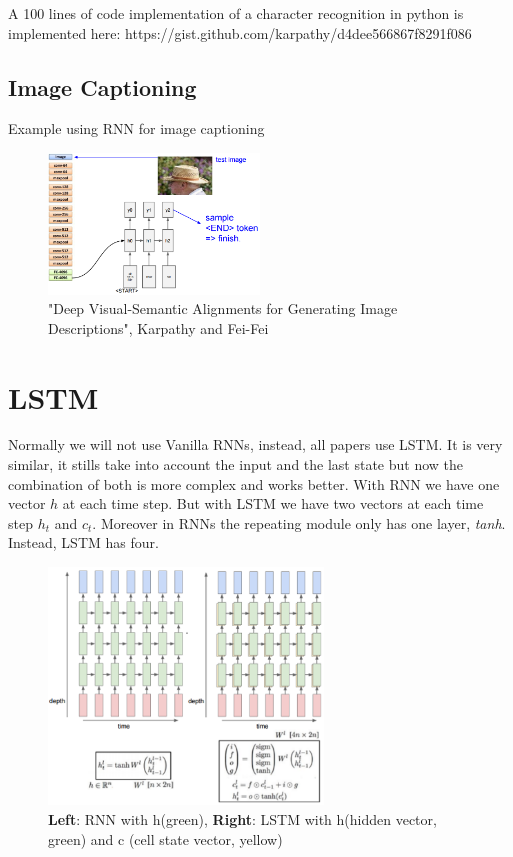 A 100 lines of code implementation of a character recognition in python is implemented here:
https://gist.github.com/karpathy/d4dee566867f8291f086

\subsection*{Image Captioning}
Example using RNN for image captioning
\begin{figure}[h]
  \centering
  \includegraphics[width=0.5\textwidth]{Images/recurrent_neural_networks/6.png}
  \caption{"Deep Visual-Semantic Alignments for Generating Image Descriptions", Karpathy and Fei-Fei}
\end{figure}

\section{LSTM}
Normally we will not use Vanilla RNNs, instead, all papers use LSTM. It is very similar, it stills take into account the input and the last state but now the combination of both is more complex and works better. With RNN we have one vector $h$ at each time step. But with LSTM we have two vectors at each time step $h_t$ and $c_t$. Moreover in RNNs the repeating module only has one layer, \textit{tanh}. Instead, LSTM has four.

\begin{figure}[ht]
  \centering
  \includegraphics[width=0.65\textwidth]{Images/recurrent_neural_networks/18.png}
  \caption{\textbf{Left}: RNN with h(green), \textbf{Right}: LSTM with h(hidden vector, green) and c (cell state vector, yellow) }
\end{figure}

